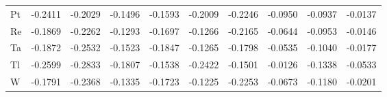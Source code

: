 \documentclass[a4paper, 12pt]{article}
\begin{document}
\begin{table}[htbp]
{\begin{tabular}{l *{9}{l}}
      Pt & -0.2411 & -0.2029 & -0.1496 & -0.1593 & -0.2009 & -0.2246 & -0.0950 & -0.0937 & -0.0137 \\
      Re & -0.1869 & -0.2262 & -0.1293 & -0.1697 & -0.1266 & -0.2165 & -0.0644 & -0.0953 & -0.0146 \\
      Ta & -0.1872 & -0.2532 & -0.1523 & -0.1847 & -0.1265 & -0.1798 & -0.0535 & -0.1040 & -0.0177 \\
      Tl & -0.2599 & -0.2833 & -0.1807 & -0.1538 & -0.2422 & -0.1501 & -0.0126 & -0.1338 & -0.0533 \\
      W  & -0.1791 & -0.2368 & -0.1335 & -0.1723 & -0.1225 & -0.2253 & -0.0673 & -0.1180 & -0.0201 \\
      \bottomrule
    \end{tabular}
  }
\end{table}
\end{document}

